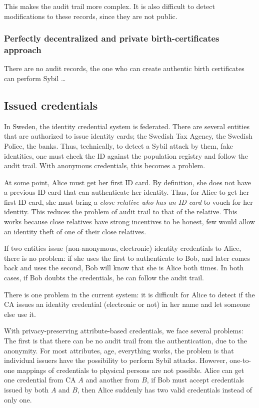 This makes the audit trail more complex.
It is also difficult to detect modifications to these records, since they are 
not public.

\subsubsection{Perfectly decentralized and private birth-certificates approach}

There are no audit records, the one who can create authentic birth certificates 
can perform Sybil \dots


\subsection{Issued credentials}

In Sweden, the identity credential system is federated.
There are several entities that are authorized to issue identity cards; \eg the 
Swedish Tax Agency, the Swedish Police, the banks.
Thus, technically, to detect a Sybil attack by them, \ie fake identities, one 
must check the ID against the population registry and follow the audit trail.
With anonymous credentials, this becomes a problem.

At some point, Alice must get her first ID card.
By definition, she does not have a previous ID card that can authenticate her 
identity.
Thus, for Alice to get her first ID card, she must bring a \emph{close relative 
  who has an ID card} to vouch for her identity.
This reduces the problem of audit trail to that of the relative.
This works because close relatives have strong incentives to be honest, few 
would allow an identity theft of one of their close relatives.

If two entities issue (non-anonymous, electronic) identity credentials to 
Alice, there is no problem: if she uses the first to authenticate to Bob, and 
later comes back and uses the second, Bob will know that she is Alice both 
times.
In both cases, if Bob doubts the credentials, he can follow the audit trail.

There is one problem in the current system: it is difficult for Alice to detect 
if the \ac{CA} issues an identity credential (electronic or not) in her name 
and let someone else use it.

With privacy-preserving attribute-based credentials, we face several problems:
The first is that there can be no audit trail from the authentication, due to 
the anonymity.
For most attributes, \eg age, everything works, the problem is that individual 
issuers have the possibility to perform Sybil attacks.
However, one-to-one mappings of credentials to physical persons are not 
possible.
Alice can get one credential from \ac{CA} \(A\) and another from \(B\), if Bob 
must accept credentials issued by both \(A\) and \(B\), then Alice suddenly has 
two valid credentials instead of only one.


